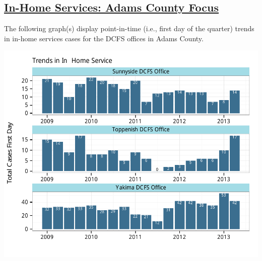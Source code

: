 \documentclass{article}\usepackage[]{graphicx}\usepackage[]{color}
\makeatletter
\def\maxwidth{ %
  \ifdim\Gin@nat@width>\linewidth
    \linewidth
  \else
    \Gin@nat@width
  \fi
}
\newenvironment{knitrout}{}{} %
\makeatother
\begin{document}
\begin{minipage}{\textwidth}
\subsection{\href{http://www.partnersforourchildren.org/child-well-being/visualizations/home-services/trends}
    {In-Home Services: Adams County Focus}
}
The following graph(s) display point-in-time (i.e., first day of the quarter) trends in in-home services cases for the DCFS offices in Adams County. 
\nopagebreak[3]
\begin{knitrout}
\color{fgcolor}

{\centering \includegraphics[width=\maxwidth]{figure/ihs_focus} 

}



\end{knitrout}

\end{minipage}

\newpage
\end{document}

